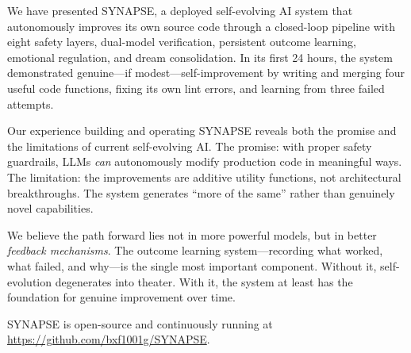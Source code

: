 \documentclass[11pt,a4paper]{article}
\begin{document}
We have presented SYNAPSE, a deployed self-evolving AI system that autonomously improves its own source code through a closed-loop pipeline with eight safety layers, dual-model verification, persistent outcome learning, emotional regulation, and dream consolidation. In its first 24 hours, the system demonstrated genuine---if modest---self-improvement by writing and merging four useful code functions, fixing its own lint errors, and learning from three failed attempts.

Our experience building and operating SYNAPSE reveals both the promise and the limitations of current self-evolving AI. The promise: with proper safety guardrails, LLMs \textit{can} autonomously modify production code in meaningful ways. The limitation: the improvements are additive utility functions, not architectural breakthroughs. The system generates ``more of the same'' rather than genuinely novel capabilities.

We believe the path forward lies not in more powerful models, but in better \textit{feedback mechanisms}. The outcome learning system---recording what worked, what failed, and why---is the single most important component. Without it, self-evolution degenerates into theater. With it, the system at least has the foundation for genuine improvement over time.

SYNAPSE is open-source and continuously running at \url{https://github.com/bxf1001g/SYNAPSE}.

\end{document}
